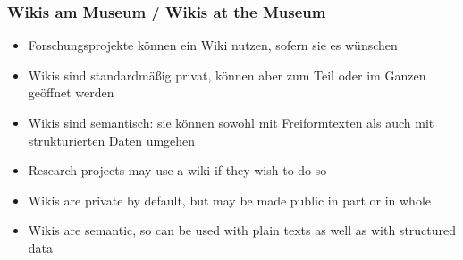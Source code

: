 \documentclass[13pt]{beamer}
\begin{document}
\begin{frame}
  \frametitle{Wikis am Museum / \textcolor{mfn_green}{Wikis at the Museum}}

  \begin{itemize}
  \item{Forschungsprojekte können ein Wiki nutzen, sofern sie es wünschen}
  \item{Wikis sind standardmäßig privat, können aber zum Teil oder im Ganzen geöffnet werden}
  \item{Wikis sind semantisch: sie können sowohl mit Freiformtexten als auch mit strukturierten Daten umgehen}
  \end{itemize}
  
  \begin{itemize}
  \item{\textcolor{mfn_green}{Research projects may use a wiki if they wish to do so}}
  \item{\textcolor{mfn_green}{Wikis are private by default, but may be made public in part or in whole}}
  \item{\textcolor{mfn_green}{Wikis are semantic, so can be used with plain texts as well as with structured data}}
  \end{itemize}
\end{frame}
\end{document}
